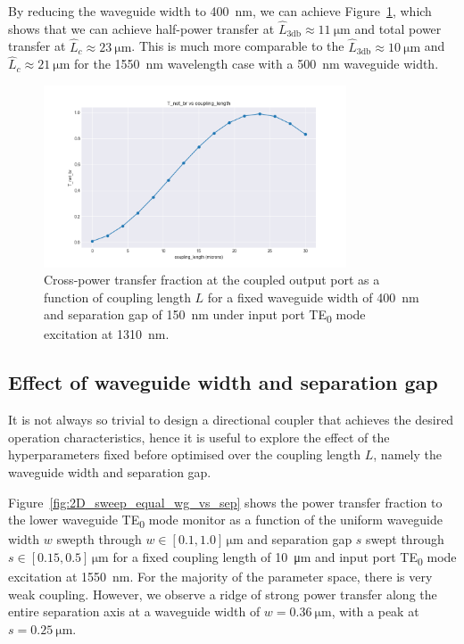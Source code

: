 \documentclass[10pt, a4paper]{article}
\begin{document}
By reducing the waveguide width to \SI{400}{\nm}, we can achieve Figure~\ref{fig:coupling_length_1310_w400},
which shows that we can achieve half-power transfer at \(\hat{L}_{3\text{db}}\approx\SI{11}{\um}\) and total power transfer at \(\hat{L}_c\approx\SI{23}{\um}\). This is much more comparable to the \(\hat{L}_{3\text{db}}\approx\SI{10}{\um}\) and \(\hat{L}_c\approx\SI{21}{\um}\) for the \SI{1550}{\nm} wavelength case with a \SI{500}{\nm} waveguide width.

\begin{figure}[h!]
  \centering
  \includegraphics[width=0.8\textwidth]{task3/sweep_plots/sweep_idx_6_sweep__coupling_length=0_30_15_wg1_width=0.4_wg2_width=0.4_separation=0.15_center_wavelength=1.31_T_net_br_line.png}
  \caption{Cross-power transfer fraction at the coupled output port as a function of coupling length \(L\) for a fixed waveguide width of \SI{400}{\nm} and separation gap of \SI{150}{\nm} under input port TE\textsubscript{0} mode excitation at \SI{1310}{\nm}.}
  \label{fig:coupling_length_1310_w400}
\end{figure}

\subsection{Effect of waveguide width and separation gap}

It is not always so trivial to design a directional coupler that achieves the desired operation characteristics,
hence it is useful to explore the effect of the hyperparameters fixed before optimised over the coupling length \(L\),
namely the waveguide width and separation gap.

Figure~\ref{fig:2D_sweep_equal_wg_vs_sep} shows the power transfer fraction to the lower waveguide TE\textsubscript{0} mode monitor
as a function of the uniform waveguide width \(w\) swepth through \(w\in[0.1, 1.0]\,\unit{\um}\) and separation gap \(s\) swept through \(s\in[0.15, 0.5]\,\unit{\um}\) for a fixed coupling length of \SI{10}{\um} and input port TE\textsubscript{0} mode excitation at \SI{1550}{\nm}. For the majority of the parameter space, there is very weak coupling.
However, we observe a ridge of strong power transfer along the entire separation axis at a waveguide width of \(w=\SI{0.36}{\um}\),
with a peak at \(s=\SI{0.25}{\um}\). 
\end{document}
